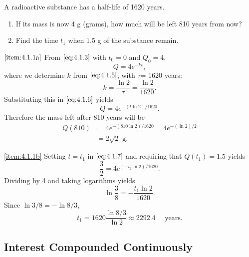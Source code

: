 \documentclass{ximera}
\begin{document}
\begin{example}\label{example:4.1.1}
A  radioactive substance has a half-life of 1620 years.
\begin{enumerate}
\item \label{item:4.1.1a}%
If its mass is now 4 g (grams), how much will be left 810 years
from now?
\item \label{item:4.1.1b}%
Find the time $t_1$ when 1.5 g of the substance remain.
\end{enumerate}
\begin{explanation}
$\ref{item:4.1.1a}$  From $\eqref{eq:4.1.3}$ with $t_0=0$ and
$Q_0=4$,
\begin{equation} \label{eq:4.1.6}
Q=4e^{-kt},
\end{equation}
 where we determine $k$ from $\eqref{eq:4.1.5}$, with $\tau$=
1620 years:
$$
k=\frac{\ln2}{\tau}=\frac{\ln2}{1620}.
$$
 Substituting this in $\eqref{eq:4.1.6}$ yields
\begin{equation} \label{eq:4.1.7}
Q=4e^{-(t\ln2)/1620}.
\end{equation}
 Therefore the mass left after 810 years will be
$$\begin{array}{rl}
Q(810) &=4e^{-(810\ln2)/1620}=4e^{-(\ln2)/2} \\
&=2\sqrt{2} \mbox{ g}.
\end{array}$$

\ref{item:4.1.1b}
 Setting $t=t_1$  in $\eqref{eq:4.1.7}$ and requiring that
$Q(t_1)=1.5$ yields
$$
\frac{3}{2}=4e^{(-t_1\ln2)/1620}.
$$
Dividing by 4 and taking logarithms yields
$$
\ln\frac{3}{8}=-\frac{t_1\ln2}{1620}.
$$
Since $\ln3/8=-\ln8/3$,
$$
t_1=1620\frac{\ln8/3}{\ln2}\approx  2292.4\quad\mbox{ years}.
$$
\end{explanation}
\end{example}

\subsection*{Interest Compounded Continuously}
\end{document}
